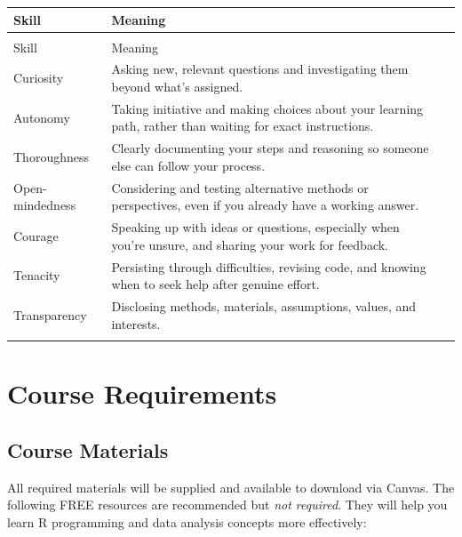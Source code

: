 \documentclass[
  12pt,
]{scrreprt}
\begin{document}
\begingroup\fontsize{9}{11}\selectfont

\begin{longtable}[t]{>{\raggedright\arraybackslash}p{3cm}>{\raggedright\arraybackslash}p{5.5cm}>{}p{7.5cm}}
\toprule
Skill & Meaning\\
\midrule
\endfirsthead
\multicolumn{2}{@{}l}{\textit{(continued)}}\\
\toprule
Skill & Meaning\\
\midrule
\endhead

\endfoot
\bottomrule
\endlastfoot
Curiosity & Asking new, relevant questions and investigating them beyond what’s assigned.\\
Autonomy & Taking initiative and making choices about your learning path, rather than waiting for exact instructions.\\
Thoroughness & Clearly documenting your steps and reasoning so someone else can follow your process.\\
Open-mindedness & Considering and testing alternative methods or perspectives, even if you already have a working answer.\\
Courage & Speaking up with ideas or questions, especially when you’re unsure, and sharing your work for feedback.\\
\addlinespace
Tenacity & Persisting through difficulties, revising code, and knowing when to seek help after genuine effort.\\
Transparency & Disclosing methods, materials, assumptions, values, and interests.\\*
\end{longtable}
\endgroup{}

\chapter{Course Requirements}\label{course-requirements}

\section{Course Materials}\label{course-materials}

All required materials will be supplied and available to download via
Canvas. The following FREE resources are recommended but \emph{not
required}. They will help you learn R programming and data analysis
concepts more effectively:
\end{document}
